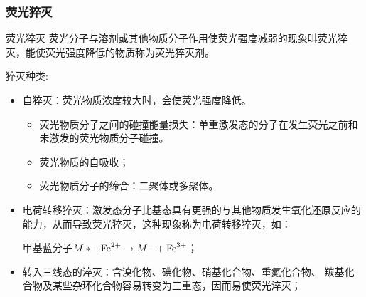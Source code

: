 \subsubsection{荧光猝灭}
\begin{definition*}{荧光猝灭}
	荧光分子与溶剂或其他物质分子作用使荧光强度减弱的现象叫荧光猝灭，能使荧光强度降低的物质称为荧光猝灭剂。
\end{definition*}
猝灭种类:
\begin{itemize}
	\item 自猝灭：荧光物质浓度较大时，会使荧光强度降低。
	\begin{itemize}
		\item 荧光物质分子之间的碰撞能量损失：单重激发态的分子在发生荧光之前和未激发的荧光物质分子碰撞。
		\item 荧光物质的自吸收；
		\item 荧光物质分子的缔合：二聚体或多聚体。
	\end{itemize}
	\item 电荷转移猝灭：激发态分子比基态具有更强的与其他物质发生氧化还原反应的能力，从而导致荧光猝灭，这种现象称为电荷转移猝灭，如：
	
	甲基蓝分子$M*+\ce{Fe^{2+}} \rightarrow M^{-}+\ce{Fe^{3+}}$；
	\item 转入三线态的淬灭：含溴化物、碘化物、硝基化合物、重氮化合物、 羰基化合物及某些杂环化合物容易转变为三重态，因而易使荧光淬灭；
\end{itemize}

